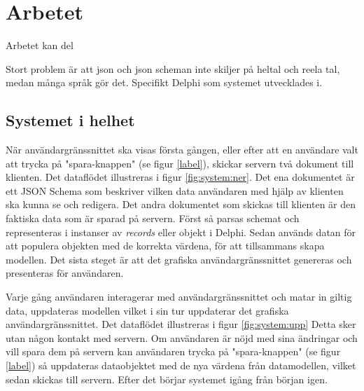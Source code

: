 \chapter{Arbetet}
\label{sec:arbetet}
Arbetet kan del


Stort problem är att json och json scheman inte skiljer på heltal och reela tal, medan många språk gör det. Specifikt Delphi som systemet utvecklades i.

\section{Systemet i helhet}

När användargränssnittet ska visas första gången, eller efter att en användare valt att trycka på "spara-knappen" (se figur \ref{label}), skickar servern två dokument till klienten. Det dataflödet illustreras i figur \ref{fig:system:ner}. Det ena dokumentet är ett JSON Schema som beskriver vilken data användaren med hjälp av klienten ska kunna se och redigera. Det andra dokumentet som skickas till klienten är den faktiska data som är sparad på servern. Först så parsas schemat och representeras i instanser av \textit{records} eller objekt i Delphi. Sedan används datan för att populera objekten med de korrekta värdena, för att tillsammans skapa modellen. Det sista steget är att det grafiska användargränssnittet genereras och presenteras för användaren.

Varje gång användaren interagerar med användargränssnittet och matar in giltig data, uppdateras modellen vilket i sin tur uppdaterar det grafiska användargränssnittet. Det dataflödet illustreras i figur \ref{fig:system:upp} Detta sker utan någon kontakt med servern. Om användaren är nöjd med sina ändringar och vill spara dem på servern kan användaren trycka på "spara-knappen" (se figur \ref{label}) så uppdateras dataobjektet med de nya värdena från datamodellen, vilket sedan skickas till servern. Efter det börjar systemet igång från början igen.

